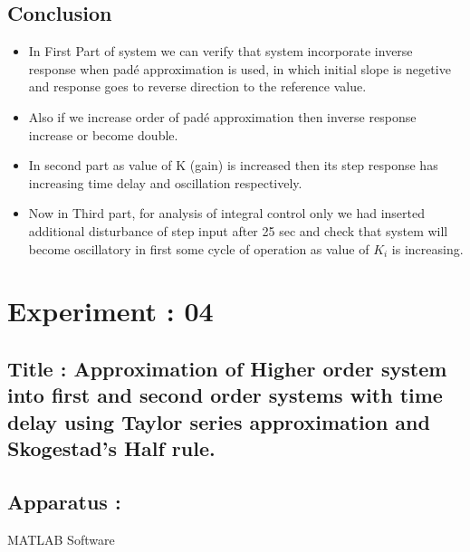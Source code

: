 \message{ !name(lab1.tex)}\documentclass[a4paper,12pt,openany]{book}
\begin{document}
\section {Conclusion}
\begin{itemize}
\item In First Part of system we can verify that system incorporate inverse
    response when pad\'e approximation is used, in which initial slope is
    negetive and response goes to reverse direction to the reference value.
\item  Also if we increase order of pad\'e approximation then inverse
     response increase or become double.
\item In second part as value of K (gain) is increased then its step response has
       increasing time delay and oscillation respectively.
\item Now in Third part, for analysis of integral control only we had
         inserted additional disturbance of step input after 25 sec and check
         that system will become oscillatory in first some cycle of operation as
         value of $K_i$ is increasing.
\end{itemize}

\chapter{Experiment : 04}
\section{Title : Approximation of Higher order system into first and second order systems with time
delay using Taylor series approximation and Skogestad's Half rule.}
\section{Apparatus :}
MATLAB Software
\end{document}

